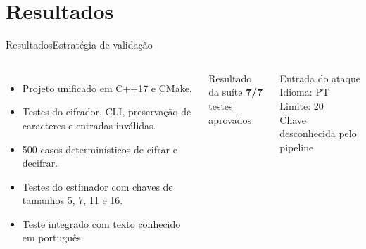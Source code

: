 \documentclass[10pt,aspectratio=169]{beamer}
\begin{document}
\section{Resultados}
\begin{frame}{Resultados}{Estratégia de validação}
  \begin{columns}[T,onlytextwidth]
      \begin{itemize}
        \item Projeto unificado em C++17 e CMake.
        \item Testes do cifrador, CLI, preservação de caracteres e entradas inválidas.
        \item 500 casos determinísticos de cifrar e decifrar.
        \item Testes do estimador com chaves de tamanhos 5, 7, 11 e 16.
        \item Teste integrado com texto conhecido em português.
      \end{itemize}
      \begin{block}{Resultado da suíte}
        \centering
        {\fontsize{28}{32}\selectfont\color{unbgreen}\textbf{7/7}}\\[4pt]
        testes aprovados
      \end{block}
      \begin{block}{Entrada do ataque}
        Idioma: PT\\
        Limite: 20\\
        Chave desconhecida pelo pipeline
      \end{block}
  \end{columns}
\end{frame}
\end{document}
